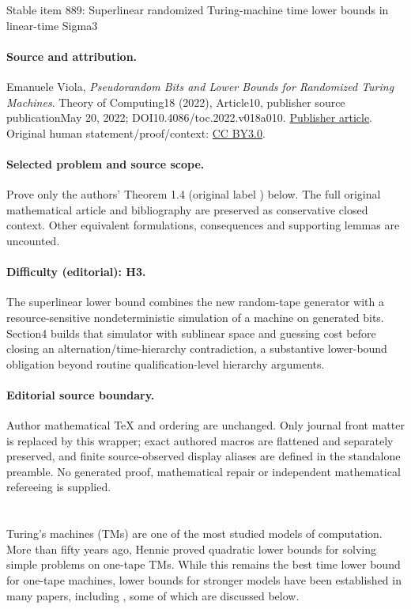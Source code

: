 \documentclass[11pt]{article}
\numberwithin{equation}{section}
\theoremstyle{definition}
\theoremstyle{plain}
\begin{document}
\begin{center}{\Large Stable item 889: Superlinear randomized Turing-machine time lower bounds in linear-time Sigma3}\end{center}
\paragraph{Source and attribution.}
Emanuele Viola, \emph{Pseudorandom Bits and Lower Bounds for Randomized Turing Machines}. Theory of Computing18 (2022), Article10, publisher source publicationMay 20, 2022; DOI10.4086/toc.2022.v018a010. \href{https://theoryofcomputing.org/articles/v018a010/}{Publisher article}. Original human statement/proof/context: \href{https://creativecommons.org/licenses/by/3.0/}{CC BY3.0}.
\paragraph{Selected problem and source scope.}
Prove only the authors' Theorem 1.4 (original label ) below. The full original mathematical article and bibliography are preserved as conservative closed context. Other equivalent formulations, consequences and supporting lemmas are uncounted.
\paragraph{Difficulty (editorial): H3.}
The superlinear lower bound combines the new random-tape generator with a resource-sensitive nondeterministic simulation of a machine on generated bits. Section4 builds that simulator with sublinear space and guessing cost before closing an alternation/time-hierarchy contradiction, a substantive lower-bound obligation beyond routine qualification-level hierarchy arguments.
\paragraph{Editorial source boundary.}
Author mathematical TeX and ordering are unchanged. Only journal front matter is replaced by this wrapper; exact authored macros are flattened and separately preserved, and finite source-observed display aliases are defined in the standalone preamble. No generated proof, mathematical repair or independent mathematical refereeing is supplied.
\clearpage

%
\section{}      %
Turing's machines (TMs) %
are one of the most studied models of computation.
More than fifty years ago, Hennie proved quadratic lower bounds \cite{DBLP:journals/iandc/Hennie65}
for solving simple problems on one-tape TMs. While this remains the
best time lower bound for one-tape machines, lower bounds for stronger
models have been established in many papers, %
 including \cite{PPST83,MR808746,MaS87,KalyanasundaramS92,DBLP:conf/coco/Santhanam01,DBLP:journals/tcs/MelkebeekR05,DBLP:journals/cc/Williams06},
some of which are discussed below.
\end{document}
